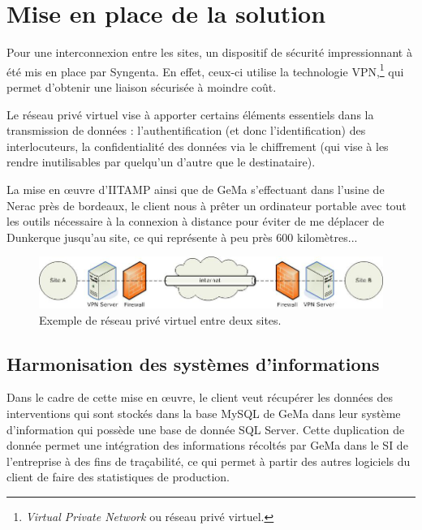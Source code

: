 \section{Mise en place de la solution} %
\label{sec:Mise en place de la solution}

Pour une interconnexion entre les sites, un dispositif de sécurité
impressionnant à été mis en place par Syngenta. En effet, ceux-ci
utilise la technologie VPN,\footnote{\emph{Virtual Private Network} ou
réseau privé virtuel.} qui permet d'obtenir une liaison sécurisée à
moindre coût.

Le réseau privé virtuel vise à apporter certains éléments essentiels
dans la transmission de données : l'authentification (et donc
l'identification) des interlocuteurs, la confidentialité des données via
le chiffrement (qui vise à les rendre inutilisables par quelqu'un
d'autre que le destinataire).

La mise en \oe{}uvre d'IITAMP ainsi que de GeMa s'effectuant dans
l'usine de Nerac près de bordeaux, le client nous à prêter un ordinateur
portable avec tout les outils nécessaire à la connexion à distance pour
éviter de me déplacer de Dunkerque jusqu'au site, ce qui représente à
peu près 600 kilomètres...

\begin{figure}
  \begin{center}
    \includegraphics[scale=0.5]{images/vpn.png}
    \caption{Exemple de réseau privé virtuel entre deux sites.}
    \label{vpn}
  \end{center}
\end{figure}

\subsection{Harmonisation des systèmes d'informations} %
\label{sub:Harmonisation des systèmes d'informations}

Dans le cadre de cette mise en \oe{}uvre, le client veut récupérer les
données des interventions qui sont stockés dans la base MySQL de GeMa
dans leur système d'information qui possède une base de donnée SQL
Server. Cette duplication de donnée permet une intégration des
informations récoltés par GeMa dans le SI de l'entreprise à des fins de
traçabilité, ce qui permet à partir des autres logiciels du client de
faire des statistiques de production.

